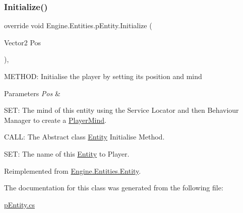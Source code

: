 \subsubsection{\texorpdfstring{Initialize()}{Initialize()}}
{\footnotesize\ttfamily override void Engine.\+Entities.\+p\+Entity.\+Initialize (\begin{DoxyParamCaption}\item[{Vector2}]{Pos }\end{DoxyParamCaption})\hspace{0.3cm}{\ttfamily [inline]}, {\ttfamily [virtual]}}



M\+E\+T\+H\+OD\+: Initialise the player by setting it\textquotesingle{}s position and mind 


\begin{DoxyParams}{Parameters}
{\em Pos} & \\
\hline
\end{DoxyParams}
S\+ET\+: The mind of this entity using the Service Locator and then Behaviour Manager to create a \hyperlink{a00326}{Player\+Mind}.

C\+A\+LL\+: The Abstract class \hyperlink{a00314}{Entity} Initialise Method.

S\+ET\+: The name of this \hyperlink{a00314}{Entity} to Player. 

Reimplemented from \hyperlink{a00314_aa1425aeeac379c5141e7560b84850b3d}{Engine.\+Entities.\+Entity}.



The documentation for this class was generated from the following file\+:\begin{DoxyCompactItemize}
\item 
\hyperlink{a00023}{p\+Entity.\+cs}\end{DoxyCompactItemize}

